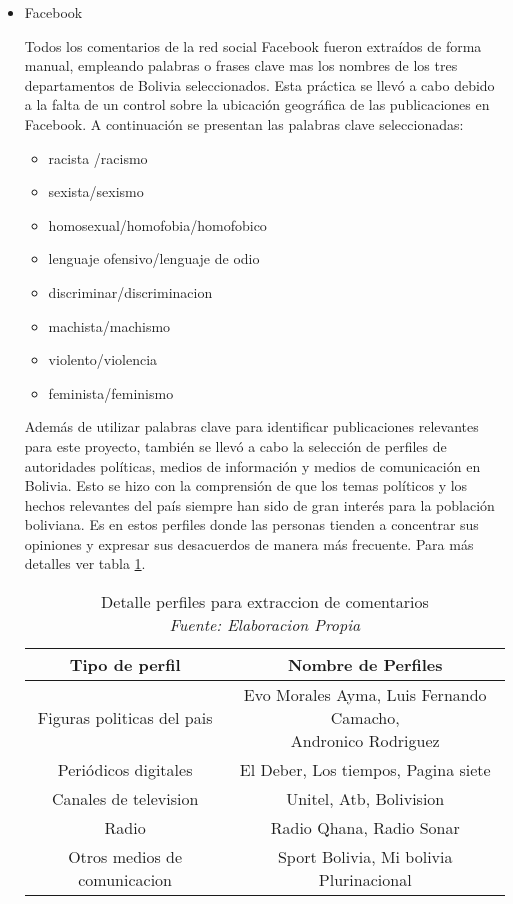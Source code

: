 \begin{itemize}

\item Facebook

Todos los comentarios de la red social Facebook fueron extraídos de forma manual, empleando palabras o frases clave mas los nombres de los tres departamentos de Bolivia seleccionados. Esta práctica se llevó a cabo debido a la falta de un control sobre la ubicación geográfica de las publicaciones en Facebook. A continuación se presentan las palabras clave seleccionadas:
\begin{itemize}
	\item racista /racismo
	\item sexista/sexismo
	\item homosexual/homofobia/homofobico
	\item lenguaje ofensivo/lenguaje de odio 
	\item discriminar/discriminacion
	\item machista/machismo
	\item violento/violencia
	\item feminista/feminismo  
\end{itemize}

Además de utilizar palabras clave para identificar publicaciones relevantes para este proyecto, también se llevó a cabo la selección de perfiles de autoridades políticas, medios de información y medios de comunicación en Bolivia. Esto se hizo con la comprensión de que los temas políticos y los hechos relevantes del país siempre han sido de gran interés para la población boliviana. Es en estos perfiles donde las personas tienden a concentrar sus opiniones y expresar sus desacuerdos de manera más frecuente. Para más detalles ver tabla \ref{tbl:16}.


\begin{table}[!ht]
	\centering
	\begin{tabular}{|c|c|}
		\hline
		\textbf{Tipo de perfil} & \textbf{Nombre de Perfiles} \\ \hline
		Figuras politicas del pais  & \makecell{Evo Morales Ayma, Luis Fernando Camacho, \\  Andronico Rodriguez} \\ \hline
		Periódicos digitales                       & El Deber, Los tiempos, Pagina siete \\ \hline
		Canales de television & Unitel, Atb, Bolivision \\ \hline
		Radio  & Radio Qhana, Radio Sonar \\ \hline
		Otros medios de comunicacion & Sport Bolivia, Mi bolivia Plurinacional \\ \hline
	\end{tabular}
	\caption[Detalle perfiles para extraccion de comentarios]{Detalle perfiles para extraccion de comentarios
		\\\textit{Fuente: Elaboracion Propia}}
	\label{tbl:16}
\end{table}


\end{itemize}
